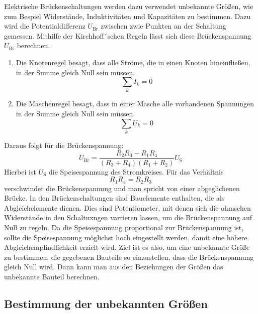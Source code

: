    Elektrische Brückenschaltungen werden dazu verwendet unbekannte Größen, wie zum Bespiel Widerstände, Induktivitäten und 
   Kapazitäten zu bestimmen.
   Dazu wird die Potentialdifferenz $U_\text{Br}$ zwischen zwie Punkten an der Schaltung gemessen.
   Mithilfe der Kirchhoff´schen Regeln lässt sich diese Brückenspannung $U_\text{Br}$ berechnen.
   \begin{enumerate}
       \item Die Knotenregel besagt, dass alle Ströme, die in einen Knoten hineinfließen, in der Summe gleich Null sein müssen.
       \begin{equation}
           \sum_k I_k = 0
       \end{equation}
       \item Die Maschenregel besagt, dass in einer Masche alle vorhandenen Spannungen in der Summe gleich Null sein müssen.
       \begin{equation}
           \sum_k U_k = 0
       \end{equation}
   \end{enumerate}
   Daraus folgt für die Brückenspannung:
   \begin{equation}
       U_\text{Br} = \frac{R_2R_3 - R_1R_4}{(R_3 + R_4)(R_1 + R_2)} U_\text{S}
   \end{equation}
   Hierbei ist $U_\text{S}$ die Speisespannung des Stromkreises.
   Für das Verhältnis
   \begin{equation}
       R_1R_4 = R_2R_3 \label{eqn: Widerstände}
   \end{equation}
   verschwindet die Brückenspannung und man spricht von einer abgeglichenen Brücke. 
   In den Brückenschaltungen sind Bauelemente enthalten, die als Abgleichelemente dienen. 
   Dies sind Potentiometer, mit denen sich die ohmschen Widerstände in den Schaltuxngen varrieren lassen, um 
   die Brückenspannung auf Null zu regeln.
   Da die Speisespannung proportional zur Brückenspannung ist, sollte die Speisespannung möglichst hoch eingestellt werden, 
   damit eine höhere Abgleichempfindlichkeit erzielt wird.
   Ziel ist es also, um eine unbekannte Größe zu bestimmen, die gegebenen Bauteile so einzustellen, dass 
   die Brückenspannung gleich Null wird. Dann kann man aus den Beziehungen der Größen das unbekannte Bauteil berechnen. %

\subsection{Bestimmung der unbekannten Größen}
  
